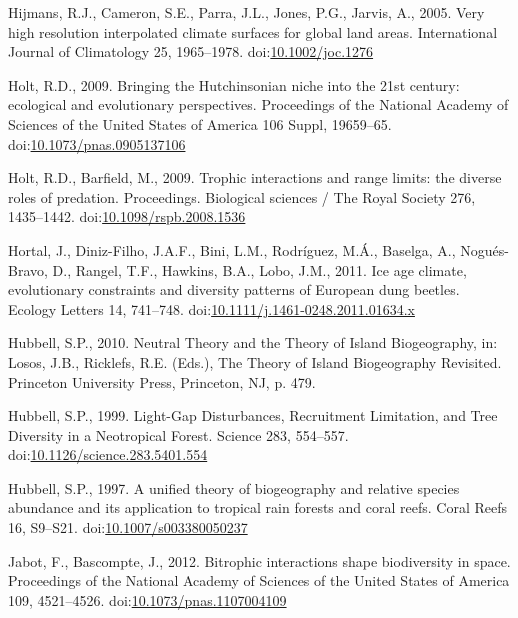 \hypertarget{ref-Hijmans2005}{}
Hijmans, R.J., Cameron, S.E., Parra, J.L., Jones, P.G., Jarvis, A.,
2005. Very high resolution interpolated climate surfaces for global land
areas. International Journal of Climatology 25, 1965--1978.
doi:\href{https://doi.org/10.1002/joc.1276}{10.1002/joc.1276}

\hypertarget{ref-Holt2009a}{}
Holt, R.D., 2009. Bringing the Hutchinsonian niche into the 21st
century: ecological and evolutionary perspectives. Proceedings of the
National Academy of Sciences of the United States of America 106 Suppl,
19659--65.
doi:\href{https://doi.org/10.1073/pnas.0905137106}{10.1073/pnas.0905137106}

\hypertarget{ref-Holt2009}{}
Holt, R.D., Barfield, M., 2009. Trophic interactions and range limits:
the diverse roles of predation. Proceedings. Biological sciences / The
Royal Society 276, 1435--1442.
doi:\href{https://doi.org/10.1098/rspb.2008.1536}{10.1098/rspb.2008.1536}

\hypertarget{ref-Hortal2011}{}
Hortal, J., Diniz-Filho, J.A.F., Bini, L.M., Rodríguez, M.Á., Baselga,
A., Nogués-Bravo, D., Rangel, T.F., Hawkins, B.A., Lobo, J.M., 2011. Ice
age climate, evolutionary constraints and diversity patterns of European
dung beetles. Ecology Letters 14, 741--748.
doi:\href{https://doi.org/10.1111/j.1461-0248.2011.01634.x}{10.1111/j.1461-0248.2011.01634.x}

\hypertarget{ref-Hubbell2010}{}
Hubbell, S.P., 2010. Neutral Theory and the Theory of Island
Biogeography, in: Losos, J.B., Ricklefs, R.E. (Eds.), The Theory of
Island Biogeography Revisited. Princeton University Press, Princeton,
NJ, p. 479.

\hypertarget{ref-Hubbell1999}{}
Hubbell, S.P., 1999. Light-Gap Disturbances, Recruitment Limitation, and
Tree Diversity in a Neotropical Forest. Science 283, 554--557.
doi:\href{https://doi.org/10.1126/science.283.5401.554}{10.1126/science.283.5401.554}

\hypertarget{ref-Hubbell1997}{}
Hubbell, S.P., 1997. A unified theory of biogeography and relative
species abundance and its application to tropical rain forests and coral
reefs. Coral Reefs 16, S9--S21.
doi:\href{https://doi.org/10.1007/s003380050237}{10.1007/s003380050237}

\hypertarget{ref-Jabot2012}{}
Jabot, F., Bascompte, J., 2012. Bitrophic interactions shape
biodiversity in space. Proceedings of the National Academy of Sciences
of the United States of America 109, 4521--4526.
doi:\href{https://doi.org/10.1073/pnas.1107004109}{10.1073/pnas.1107004109}

